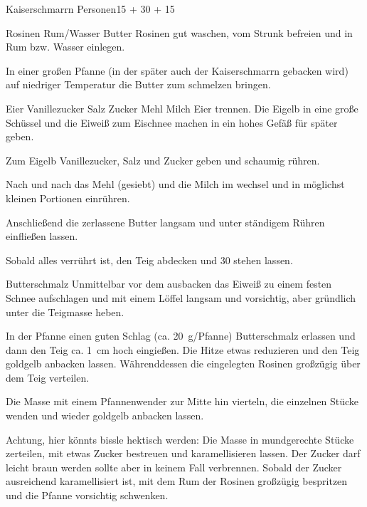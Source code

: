 \begin{MyRecipe}{Kaiserschmarrn}{ Personen}{\SI{15}{\minuteprime} + \SI{30}{\minuteprime} + \SI{15}{\minuteprime}}
	
	\ingredient[\Calc{60}{\x}]{\si{\gram}} {Rosinen}
	 {Rum/Wasser}
	\ingredient[\Calc{30}{\x}]{\si{\gram}} {Butter}
	Rosinen gut waschen, vom Strunk befreien und in Rum bzw. Wasser einlegen.
	
	In einer großen Pfanne (in der später auch der Kaiserschmarrn gebacken wird) auf niedriger Temperatur die Butter zum schmelzen bringen.\par\bigskip
	
	\ingredient[\Calc{4}{\x}]{} {Eier}
	 {Vanillezucker}
	 {Salz}
	 {Zucker}
	\ingredient[\Calc{0.16}{\x}]{\si{\kilogram}} {Mehl}
	\ingredient[\Calc{0.33}{\x}]{\si{\kilogram}} {Milch}
	Eier trennen. Die Eigelb in eine große Schüssel und die Eiweiß zum Eischnee machen in ein hohes Gefäß für später geben.
	
	Zum Eigelb Vanillezucker, Salz und Zucker geben und schaumig rühren.
	
	Nach und nach das Mehl (gesiebt) und die Milch im wechsel und in möglichst kleinen Portionen einrühren.
	
	Anschließend die zerlassene Butter langsam und unter ständigem Rühren einfließen lassen.
	
	Sobald alles verrührt ist, den Teig abdecken und \SI{30}{\minuteprime} stehen lassen.\par\bigskip
	
	 {Butterschmalz}
	Unmittelbar vor dem ausbacken das Eiweiß zu einem festen Schnee aufschlagen und mit einem Löffel langsam und vorsichtig, aber gründlich unter die Teigmasse heben.
	
	In der Pfanne einen guten Schlag (ca. \SI{20}{\gram}/Pfanne) Butterschmalz erlassen und dann den Teig ca. \SI{1}{\centi\meter} hoch eingießen. Die Hitze etwas reduzieren und den Teig goldgelb anbacken lassen. Währenddessen die eingelegten Rosinen großzügig über dem Teig verteilen.
	
	Die Masse mit einem Pfannenwender zur Mitte hin vierteln, die einzelnen Stücke wenden und wieder goldgelb anbacken lassen.
	
	Achtung, hier könnts bissle hektisch werden:
	Die Masse in mundgerechte Stücke zerteilen, mit etwas Zucker bestreuen und karamellisieren lassen. Der Zucker darf leicht braun werden sollte aber in keinem Fall verbrennen. Sobald der Zucker ausreichend karamellisiert ist, mit dem Rum der Rosinen großzügig bespritzen und die Pfanne vorsichtig schwenken.\par\bigskip
	

\end{MyRecipe}
